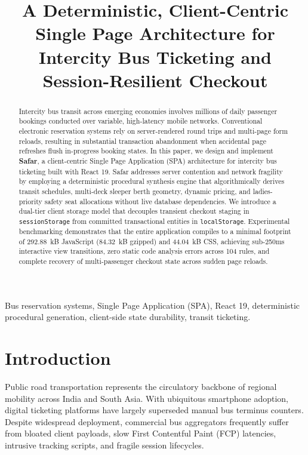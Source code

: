 \documentclass[conference]{IEEEtran}
\begin{document}
\title{A Deterministic, Client-Centric Single Page Architecture for Intercity Bus Ticketing and Session-Resilient Checkout}

\author{
}

\maketitle

\begin{abstract}
Intercity bus transit across emerging economies involves millions of daily passenger bookings conducted over variable, high-latency mobile networks. Conventional electronic reservation systems rely on server-rendered round trips and multi-page form reloads, resulting in substantial transaction abandonment when accidental page refreshes flush in-progress booking states. In this paper, we design and implement \textbf{Safar}, a client-centric Single Page Application (SPA) architecture for intercity bus ticketing built with React 19. Safar addresses server contention and network fragility by employing a deterministic procedural synthesis engine that algorithmically derives transit schedules, multi-deck sleeper berth geometry, dynamic pricing, and ladies-priority safety seat allocations without live database dependencies. We introduce a dual-tier client storage model that decouples transient checkout staging in \texttt{sessionStorage} from committed transactional entities in \texttt{localStorage}. Experimental benchmarking demonstrates that the entire application compiles to a minimal footprint of 292.88~kB JavaScript (84.32~kB gzipped) and 44.04~kB CSS, achieving sub-250ms interactive view transitions, zero static code analysis errors across 104 rules, and complete recovery of multi-passenger checkout state across sudden page reloads.
\end{abstract}

\begin{IEEEkeywords}
Bus reservation systems, Single Page Application (SPA), React 19, deterministic procedural generation, client-side state durability, transit ticketing.
\end{IEEEkeywords}

\section{Introduction}
Public road transportation represents the circulatory backbone of regional mobility across India and South Asia. With ubiquitous smartphone adoption, digital ticketing platforms have largely superseded manual bus terminus counters. Despite widespread deployment, commercial bus aggregators frequently suffer from bloated client payloads, slow First Contentful Paint (FCP) latencies, intrusive tracking scripts, and fragile session lifecycles.
\end{document}
